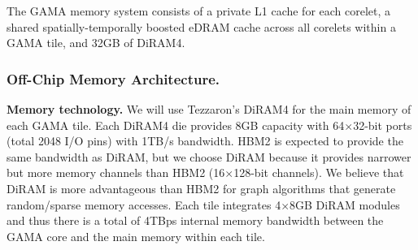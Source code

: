 



\noindent
The GAMA memory system consists of a private L1 cache for each corelet, a shared spatially-temporally boosted eDRAM cache across all corelets within a GAMA tile, and 32GB of DiRAM4.    

\noindent
\subsubsection{Off-Chip Memory Architecture.} 
\label{sec:memory:off-chip}
\noindent
\textbf{Memory technology.} 
We will use  Tezzaron's DiRAM4 for the main memory of each GAMA tile.  
Each DiRAM4 die provides 8GB capacity with 64$\times$32-bit ports (total 2048 I/O pins) with 1TB/s bandwidth. 
HBM2 is expected to provide the same bandwidth as DiRAM, but we choose DiRAM because it provides narrower but more memory channels than HBM2 (16$\times$128-bit channels). 
We believe that DiRAM is more advantageous than HBM2 for graph algorithms that generate random/sparse memory accesses. 
Each tile integrates 4$\times$8GB DiRAM modules and thus there is a total of 4TBps internal memory bandwidth between the GAMA core and the main memory within each tile. 

